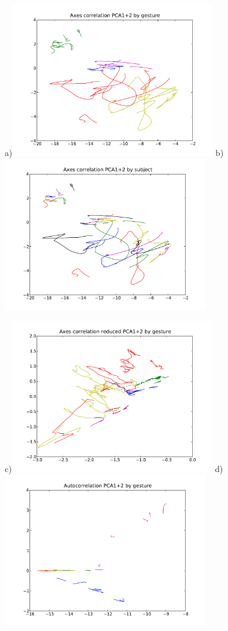 \documentclass{article}
\begin{document}
\begin{figure}
\vspace{-1in}
\centerline{
  a)\includegraphics[width=3.5in]{pca_axes_cor_by_gesture.pdf}
  b)\includegraphics[width=3.5in]{pca_axes_cor_by_subject.pdf}}
\centerline{
  c)\includegraphics[width=3.5in]{pca_axes_cor_reduced_by_gesture.pdf}
  d)\includegraphics[width=3.5in]{pca_autocor_by_gesture.pdf}}

\end{figure}
\end{document}
